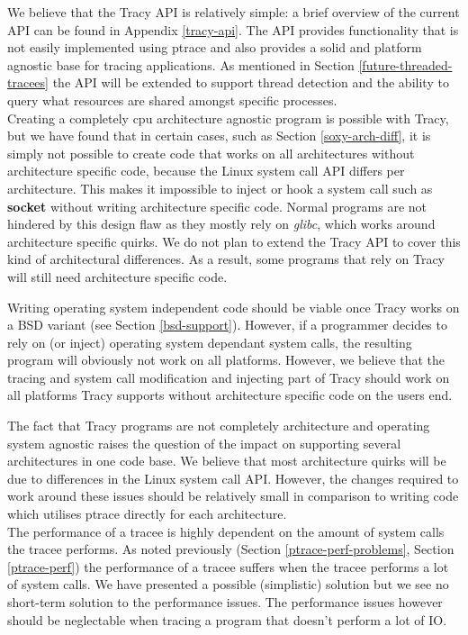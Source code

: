 \documentclass[a4paper, 10pt]{report}
\begin{document}
We believe that the Tracy API is relatively simple: a brief overview of
the current API can be found in Appendix \ref{tracy-api}. The API provides
functionality that is not easily implemented using ptrace and also provides a
solid and platform agnostic base for tracing applications. As mentioned in
Section \ref{future-threaded-tracees} the API will be extended to support
thread detection and the ability to query what resources are shared amongst
specific processes. \\

Creating a completely cpu architecture agnostic program is possible with Tracy,
but we have found that in certain cases, such as Section \ref{soxy-arch-diff},
it is simply not possible to create code that works on all architectures without
architecture specific code, because the Linux system call API differs per
architecture. This makes it impossible to inject or hook a system call such as
\textbf{socket} without writing architecture specific code.
Normal programs are not hindered by this design flaw as they mostly rely on
\textit{glibc}, which works around architecture specific quirks. We do not plan
to extend the Tracy API to cover this kind of architectural differences. As a
result, some programs that rely on Tracy will still need architecture specific
code. %

Writing operating system independent code should be viable once Tracy works on
a BSD variant (see Section \ref{bsd-support}). However, if a programmer decides
to rely on (or inject) operating system dependant system calls, the resulting
program will obviously not work on all platforms. However, we believe that the
tracing and system call modification and injecting part of Tracy should work on
all platforms Tracy supports without architecture specific code on the users
end.

The fact that Tracy programs are not completely architecture and operating system
agnostic raises the question of the impact on supporting several architectures
in one code base. We believe that most architecture quirks will be due to
differences in the Linux system call API. However, the changes required to work
around these issues should be relatively small in comparison to writing code
which utilises ptrace directly for each architecture. \\

The performance of a tracee is highly dependent on the amount of system calls
the tracee performs. As noted previously (Section \ref{ptrace-perf-problems},
Section \ref{ptrace-perf}) the performance of a tracee suffers when the tracee
performs a lot of system calls. We have presented a possible (simplistic)
solution but we see no short-term solution to the performance issues.
The performance issues however should be neglectable when tracing a program
that doesn't perform a lot of IO. \\
\end{document}

